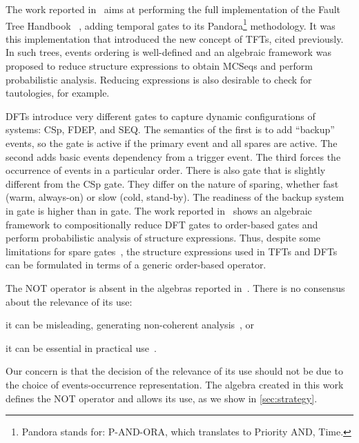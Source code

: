 \documentclass[12pt,openright,twoside,a4paper,oldfontcommands,english,brazil,draft]{abntex2}
\theoremstyle{theo}
\def\FThandbook{Fault Tree Handbook~\cite{VGR+1981}\index{Fault Tree!Handbook}%
  \gdef\FThandbook{Fault Tree Handbook\index{Fault Tree!Handbook}\xspace}%
  \xspace}
\def\pandora{Pandora\footnote{Pandora stands for: P-AND-ORA, which translates to Priority AND, Time.}%
  \gdef\pandora{Pandora\xspace}%
  \xspace}
\begin{document}
The work reported in~\cite{WP2009} aims at performing the full implementation of the \FThandbook, adding temporal gates to its \pandora methodology.
It was this implementation that introduced the new concept of \acp{TFT}, cited previously.
In such trees, events ordering is well-defined and an algebraic framework was proposed to reduce structure expressions to obtain \acp{MCSeq} and perform probabilistic analysis.
Reducing expressions is also desirable to check for tautologies, for example.

\Acp{DFT} introduce very different gates to capture dynamic configurations of systems: \ac{CSp}, \ac{FDEP}, and \ac{SEQ}.
The semantics of the first is to add ``backup'' events, so the gate is active if the primary event and all spares are active.
The second adds basic events dependency from a trigger event.
The third forces the occurrence of events in a particular order.
There is also  gate that is slightly different from the \ac{CSp} gate.
They differ on the nature of sparing, whether fast (warm, always-on) or slow (cold, stand-by).
The readiness of the backup system in  gate is higher than in  gate.
The work reported in~\cite{MRL2011} shows an algebraic framework to compositionally reduce \ac{DFT} gates to order-based gates and perform probabilistic analysis of structure expressions. Thus, despite some limitations for spare gates~\cite{MRL2014}, the structure expressions used in \acp{TFT} and \acp{DFT} can be formulated in terms of a generic order-based operator.

\begin{sloppypar}
The NOT operator is absent in the algebras reported in~\cite{WP2009,Walker2009,Merle2010,MRL2011b}.
There is no consensus about the relevance of its use:
\begin{alineasinline}
  \item it can be misleading, generating non-coherent analysis~\cite{Oliv2006}, or
  \item it can be essential in practical use~\cite{Andrews2001}.
\end{alineasinline}
Our concern is that the decision of the relevance of its use should not be due to the choice of events-occurrence representation.
The algebra created in this work defines the NOT operator and allows its use, as we show in \cref{sec:strategy}.
\end{sloppypar}
\end{document}
